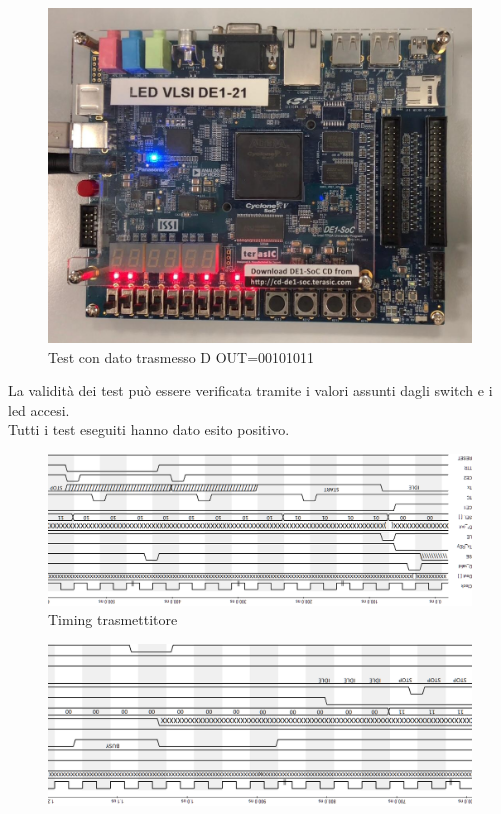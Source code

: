 \documentclass[a4paper, titlepage]{article}
\begin{document}
\begin{figure}[h]
    \centering
    \includegraphics[scale=0.25]{WhatsApp Image 2020-03-12 at 18.31.54.jpeg}
    \caption{Test con dato trasmesso D \textunderscore OUT=00101011}
    \label{fig:test_3}
\end{figure}
La validità dei test può essere verificata tramite i valori assunti dagli switch e i led accesi.\\Tutti i test eseguiti hanno dato esito positivo.
\begin{figure}
\centering
\includegraphics[scale=0.7]{timingtxV6_1.png} 
\caption{Timing trasmettitore}
\label{TX Timing}
\end{figure}
\begin{figure}
\centering
\includegraphics[scale=0.7]{timingtxV5_2.png} 
\end{figure}
\end{document}
